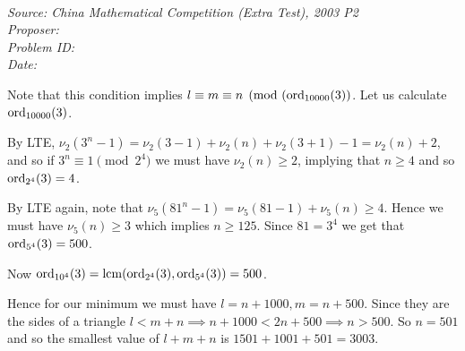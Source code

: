 \SSbreak\\
\emph{Source: China Mathematical Competition (Extra Test), 2003 P2}\\
\emph{Proposer: \Pss}\\
\emph{Problem ID:}\\
\emph{Date: }\\
\SSbreak

\bigskip

\begin{solution}\hfil\medskip

Note that this condition implies $l \equiv m \equiv n \pmod{(\operatorname{ord}_{10000}(3)}$. Let us calculate $\operatorname{ord}_{10000}(3)$. \medskip

By LTE, $\nu_2(3^n -1) = \nu_2(3-1) + \nu_2(n) + \nu_2(3+1) - 1 = \nu_2(n) + 2$, and so if $3^n \equiv 1 \pmod 2^4$ we must have $\nu_2(n) \ge 2$, implying that $n \ge 4$ and so $\operatorname{ord}_{2^4}(3) = 4$. \medskip

By LTE again, note that $\nu_5(81^n - 1) = \nu_5(81 - 1) + \nu_5(n) \ge 4$. Hence we must have $\nu_5(n) \ge 3$ which implies $n \ge 125$. Since $81 = 3^4$ we get that $\operatorname{ord}_{5^4}(3) = 500$. \medskip

Now $\operatorname{ord}_{10^4}(3) = \operatorname{lcm}(\operatorname{ord}_{2^4}(3), \operatorname{ord}_{5^4}(3)) = 500$. \medskip

Hence for our minimum we must have $l = n + 1000, m = n + 500$. Since they are the sides of a triangle $l < m + n \implies n + 1000 < 2n + 500 \implies n > 500$. So $n = 501$ and so the smallest value of $l+m+n$ is $1501 + 1001 + 501 = \boxed{3003}$. 
\end{solution}
